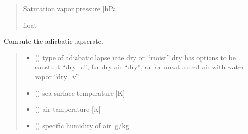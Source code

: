 \documentclass[letterpaper,10pt,english]{sphinxmanual}
\begin{document}
\begin{fulllineitems}
\begin{quote}
\begin{description}
\begin{itemize}
\end{itemize}

\sphinxAtStartPar
{} \textendash{} Saturation vapor pressure {[}hPa{]}

\sphinxAtStartPar
float

\end{description}\end{quote}

\end{fulllineitems}


\begin{fulllineitems}
\label{\detokenize{users_guide:AirSeaFluxCode.hum_subs.gamma}}
\pysigstartsignatures
{}
\pysigstopsignatures
\sphinxAtStartPar
Compute the adiabatic lapse\sphinxhyphen{}rate.
\begin{quote}\begin{description}
\begin{itemize}
\item {} 
\sphinxAtStartPar
{} () \textendash{} type of adiabatic lapse rate dry or “moist”
dry has options to be constant “dry\_c”, for dry air “dry”, or
for unsaturated air with water vapor “dry\_v”

\item {} 
\sphinxAtStartPar
{} () \textendash{} sea surface temperature {[}K{]}

\item {} 
\sphinxAtStartPar
{} () \textendash{} air temperature {[}K{]}

\item {} 
\sphinxAtStartPar
{} () \textendash{} specific humidity of air {[}g/kg{]}


\end{itemize}
\end{description}
\end{quote}
\end{fulllineitems}
\end{document}
